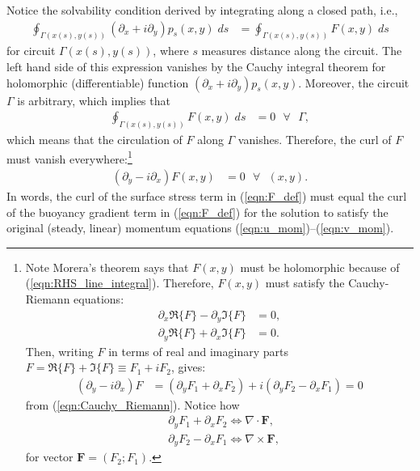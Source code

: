 \documentclass[10pt]{amsart}
\begin{document}
Notice the solvability condition derived by integrating along a closed path, i.e., 
\begin{align}
\oint_{\Gamma(x(s),y(s))}  \left( \partial_x  + i \partial_y  \right) p_s (x,y) \; ds & = \oint_{\Gamma(x(s),y(s))} F(x,y) \; ds
\end{align}
for circuit $\Gamma(x(s),y(s))$, where $s$ measures distance along the circuit.
The left hand side of this expression vanishes by the Cauchy integral theorem for holomorphic (differentiable) function $\left( \partial_x  + i \partial_y  \right) p_s (x,y)$.
Moreover, the circuit $\Gamma$ is arbitrary, which implies that 
\begin{align}
 \oint_{\Gamma(x(s),y(s))} F(x,y) \; ds & = 0 \text{~~} \forall \text{~~} \Gamma ,
 \label{eqn:RHS_line_integral}
\end{align}
which means that the circulation of $F$ along $\Gamma$ vanishes.
Therefore, the curl of $F$ must vanish everywhere:\footnote{Note Morera's theorem says that $F(x,y)$ must be holomorphic because of (\ref{eqn:RHS_line_integral}).
Therefore, $F(x,y)$ must satisfy the Cauchy-Riemann equations:
\begin{align}
\partial_x \Re \{ F \} - \partial_y \Im \{ F \} & = 0 , \nonumber \\
\partial_y \Re \{ F \} + \partial_x \Im \{ F \} & = 0 . 
\label{eqn:Cauchy_Riemann}
\end{align}
Then, writing $F$ in terms of real and imaginary parts $F = \Re \{F\} + \Im \{F\} \equiv F_1 + i F_2$, gives:
\begin{align}
\left( \partial_y  - i \partial_x\right) F &= \left( \partial_y F_1 + \partial_x F_2 \right) + i \left( \partial_y F_2 - \partial_x F_1 \right)  = 0 \nonumber 
\end{align}
from (\ref{eqn:Cauchy_Riemann}).
Notice how 
\begin{align}
& \partial_y F_1 + \partial_x F_2 \Leftrightarrow \nabla \cdot \mathbf{F} , \nonumber \\
& \partial_y F_2 - \partial_x F_1   \Leftrightarrow \nabla \times \mathbf{F} , \nonumber 
\end{align}
for vector $\mathbf{F} = (F_2; F_1)$.
 }
\begin{align}
\left( \partial_y - i \partial_x \right)F(x,y) & = 0 \text{~~} \forall \text{~~} (x,y) .
\end{align}
In words, the curl of the surface stress term in (\ref{eqn:F_def}) must equal the curl of the buoyancy gradient term in (\ref{eqn:F_def}) for the solution to satisfy the original (steady, linear) momentum equations (\ref{eqn:u_mom})--(\ref{eqn:v_mom}).
\end{document}
